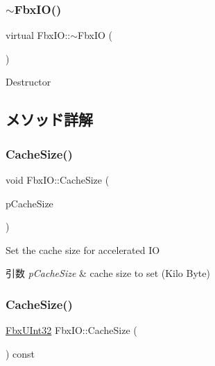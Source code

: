 \subsubsection{\texorpdfstring{$\sim$\+Fbx\+I\+O()}{~FbxIO()}}
{\footnotesize\ttfamily virtual Fbx\+I\+O\+::$\sim$\+Fbx\+IO (\begin{DoxyParamCaption}{ }\end{DoxyParamCaption})\hspace{0.3cm}{\ttfamily [virtual]}}

Destructor 

\subsection{メソッド詳解}
\mbox{\label{class_fbx_i_o_aa60c36412a1a48e44fbdb41fe9a31394}} 
\subsubsection{\texorpdfstring{Cache\+Size()}{CacheSize()}\hspace{0.1cm}{\footnotesize\ttfamily [1/2]}}
{\footnotesize\ttfamily void Fbx\+I\+O\+::\+Cache\+Size (\begin{DoxyParamCaption}\item[{\hyperlink{fbxtypes_8h_a53c19005808129cb4efa0dcbb71fdb09}{Fbx\+U\+Int32}}]{p\+Cache\+Size }\end{DoxyParamCaption})}

Set the cache size for accelerated IO 
\begin{DoxyParams}{引数}
{\em p\+Cache\+Size} & cache size to set (Kilo Byte) \\
\hline
\end{DoxyParams}
\mbox{\label{class_fbx_i_o_a8a06f9cca3b61b927401a1283e072ee4}} 
\subsubsection{\texorpdfstring{Cache\+Size()}{CacheSize()}\hspace{0.1cm}{\footnotesize\ttfamily [2/2]}}
{\footnotesize\ttfamily \hyperlink{fbxtypes_8h_a53c19005808129cb4efa0dcbb71fdb09}{Fbx\+U\+Int32} Fbx\+I\+O\+::\+Cache\+Size (\begin{DoxyParamCaption}{ }\end{DoxyParamCaption}) const}

